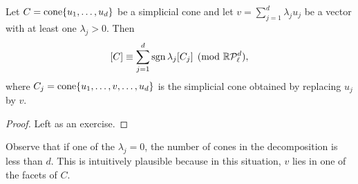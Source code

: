 \begin{lemma}
  \label{lemma:simplicial-cone-signed-star}
  Let $C = \operatorname{cone}\{u_1,\ldots,u_d\}$ be a simplicial cone and let
  $v = \sum_{j=1}^d \lambda_j u_j$ be a vector with at least one $\lambda_j > 0$.
  Then
  \[
    [C] \equiv \sum_{j=1}^d \operatorname{sgn} \lambda_j [C_j] \pmod{\mathbb{R}\mathcal{P}_\ell^d},
  \]
  where $C_j = \operatorname{cone}\{u_1,\ldots,v,\ldots,u_d\}$ is the simplicial cone obtained by
  replacing $u_j$ by $v$.
\end{lemma}
\begin{proof}
  Left as an exercise.
\end{proof}

Observe that if one of the $\lambda_j = 0$,
the number of cones in the decomposition is less than $d$.
This is intuitively plausible because in this situation,
$v$ lies in one of the facets of $C$.

